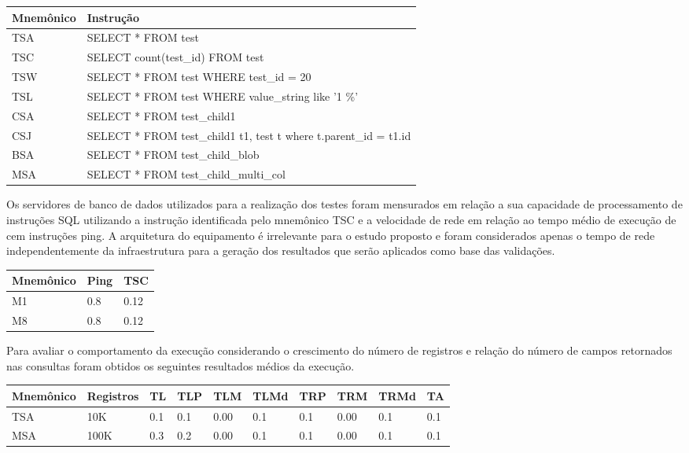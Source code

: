 \documentclass[12pt, a4paper]{article}
\begin{document}
\begin{tabular}{l l}
\hline
Mnemônico & Instrução \\
\hline
TSA & SELECT * FROM test \\
TSC & SELECT count(test\_id) FROM test \\
TSW & SELECT * FROM test WHERE test\_id = 20\\
TSL & SELECT * FROM test WHERE value\_string like '1 \%'\\
CSA & SELECT * FROM test\_child1\\
CSJ & SELECT * FROM test\_child1 t1, test t where t.parent\_id = t1.id\\
BSA & SELECT * FROM test\_child\_blob\\
MSA & SELECT * FROM test\_child\_multi\_col\\
\hline
\end{tabular}

Os servidores de banco de dados utilizados para a realização dos testes foram mensurados em relação a
sua capacidade de processamento de instruções SQL utilizando a instrução identificada pelo mnemônico
TSC e a velocidade de rede em relação ao tempo médio de execução de cem instruções ping. A arquitetura
do equipamento é irrelevante para o estudo proposto e foram considerados apenas o tempo de rede independentemente
da infraestrutura para a geração dos resultados que serão aplicados como base das validações.

\begin{tabular}{l l l}
\hline
Mnemônico & Ping & TSC \\
\hline
M1 & 0.8 & 0.12 \\
M8 & 0.8 & 0.12 \\
\hline
\end{tabular}


Para avaliar o comportamento da execução considerando o crescimento do número de registros e relação do
número de campos retornados nas consultas foram obtidos os seguintes resultados médios da execução.

\begin{tabular}{l l l l l l l l l l}
\hline
Mnemônico & Registros & TL &TLP &TLM & TLMd & TRP & TRM & TRMd & TA \\
\hline
TSA & 10K & 0.1 & 0.1 & 0.00 & 0.1 & 0.1  & 0.00 & 0.1 & 0.1 \\
MSA & 100K & 0.3 & 0.2 & 0.00 & 0.1 & 0.1  & 0.00 & 0.1 & 0.1 \\

\hline
\end{tabular}
\end{document}
